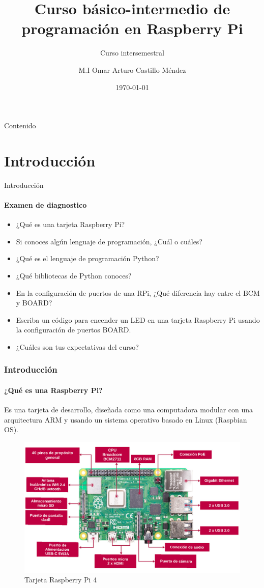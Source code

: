 \documentclass{beamer}
\title{Curso básico-intermedio de programación en Raspberry Pi}
\subtitle{Curso intersemestral}
\date{\today}
\author[OACM]{M.I Omar Arturo Castillo Méndez}
\begin{document}
	
	\begin{frame}[plain]
		\titlepage
	\end{frame}
	
	\begin{frame}{Contenido}
		\tableofcontents
	\end{frame}
	
	\section{Introducción}
	
	\begin{frame}{Introducción}
		\framesubtitle{Examen de diagnostico}
		\begin{itemize}
			\item ¿Qué es una tarjeta Raspberry Pi?
			\item Si conoces algún lenguaje de programación, ¿Cuál o cuáles?
			\item ¿Qué es el lenguaje de programación Python?
			\item ¿Qué bibliotecas de Python conoces?
			\item En la configuración de puertos de una RPi, ¿Qué diferencia hay entre el BCM y BOARD?
			\item Escriba un código para encender un LED en una tarjeta Raspberry Pi usando la configuración de puertos BOARD.
			\item ¿Cuáles son tus expectativas del curso?
		\end{itemize}
	\end{frame}
	
	\begin{frame}
		\frametitle{Introducción}
		\framesubtitle{¿Qué es una Raspberry Pi?}
		Es una tarjeta de desarrollo, diseñada como una computadora modular con una arquitectura ARM y usando un sistema operativo basado en Linux (Raspbian OS).
		\begin{figure}
			\includegraphics[scale=0.4]{rpiboard}
			\caption{Tarjeta Raspberry Pi 4}
		\end{figure}
		
	\end{frame}	
\end{document}

